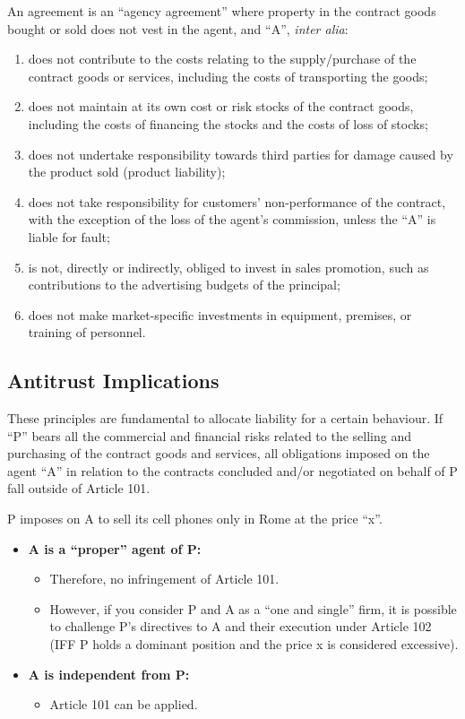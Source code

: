         An agreement is an ``agency agreement'' where property in the contract goods bought or sold does not vest in the agent, and ``A'', \textit{inter alia}:
        \begin{enumerate}
            \item does not contribute to the costs relating to the supply/purchase of the contract goods or services, including the costs of transporting the goods;
            \item does not maintain at its own cost or risk stocks of the contract goods, including the costs of financing the stocks and the costs of loss of stocks;
            \item does not undertake responsibility towards third parties for damage caused by the product sold (product liability);
            \item does not take responsibility for customers' non-performance of the contract, with the exception of the loss of the agent's commission, unless the ``A'' is liable for fault;
            \item is not, directly or indirectly, obliged to invest in sales promotion, such as contributions to the advertising budgets of the principal;
            \item does not make market-specific investments in equipment, premises, or training of personnel.
        \end{enumerate}

    \subsection{Antitrust Implications}

        These principles are fundamental to allocate liability for a certain behaviour. If ``P'' bears all the commercial and financial risks related to the selling and purchasing of the contract goods and services, all obligations imposed on the agent ``A'' in relation to the contracts concluded and/or negotiated on behalf of P fall outside of Article 101.

        P imposes on A to sell its cell phones only in Rome at the price ``x''.
        \begin{itemize}
            \item \textbf{A is a ``proper'' agent of P:}
            \begin{itemize}
                \item Therefore, no infringement of Article 101.
                \item However, if you consider P and A as a ``one and single'' firm, it is possible to challenge P’s directives to A and their execution under Article 102 (IFF P holds a dominant position and the price x is considered excessive).
            \end{itemize}
            
            \item \textbf{A is independent from P:}
            \begin{itemize}
                \item Article 101 can be applied.
            \end{itemize}
        \end{itemize}

